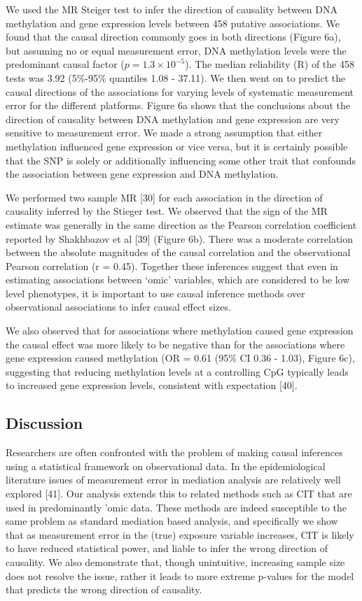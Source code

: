 \documentclass[]{article}
\begin{document}
We used the MR Steiger test to infer the direction of causality between
DNA methylation and gene expression levels between 458 putative
associations. We found that the causal direction commonly goes in both
directions (Figure 6a), but assuming no or equal measurement error, DNA
methylation levels were the predominant causal factor
(\(p = 1.3\times 10^{-5}\)). The median reliability (R) of the 458 tests
was 3.92 (5\%-95\% quantiles 1.08 - 37.11). We then went on to predict
the causal directions of the associations for varying levels of
systematic measurement error for the different platforms. Figure 6a
shows that the conclusions about the direction of causality between DNA
methylation and gene expression are very sensitive to measurement error.
We made a strong assumption that either methylation influenced gene
expression or vice versa, but it is certainly possible that the SNP is
solely or additionally influencing some other trait that confounds the
association between gene expression and DNA methylation.

We performed two sample MR {[}30{]} for each association in the
direction of causality inferred by the Stieger test. We observed that
the sign of the MR estimate was generally in the same direction as the
Pearson correlation coefficient reported by Shakhbazov et al {[}39{]}
(Figure 6b). There was a moderate correlation between the absolute
magnitudes of the causal correlation and the observational Pearson
correlation (r = 0.45). Together these inferences suggest that even in
estimating associations between `omic' variables, which are considered
to be low level phenotypes, it is important to use causal inference
methods over observational associations to infer causal effect sizes.

We also observed that for associations where methylation caused gene
expression the causal effect was more likely to be negative than for the
associations where gene expression caused methylation (OR = 0.61 (95\%
CI 0.36 - 1.03), Figure 6c), suggesting that reducing methylation levels
at a controlling CpG typically leads to increased gene expression
levels, consistent with expectation {[}40{]}.

\subsection{Discussion}\label{discussion}

Researchers are often confronted with the problem of making causal
inferences using a statistical framework on observational data. In the
epidemiological literature issues of measurement error in mediation
analysis are relatively well explored {[}41{]}. Our analysis extends
this to related methods such as CIT that are used in predominantly 'omic
data. These methods are indeed susceptible to the same problem as
standard mediation based analysis, and specifically we show that as
measurement error in the (true) exposure variable increases, CIT is
likely to have reduced statistical power, and liable to infer the wrong
direction of causality. We also demonstrate that, though unintuitive,
increasing sample size does not resolve the issue, rather it leads to
more extreme p-values for the model that predicts the wrong direction of
causality.
\end{document}
